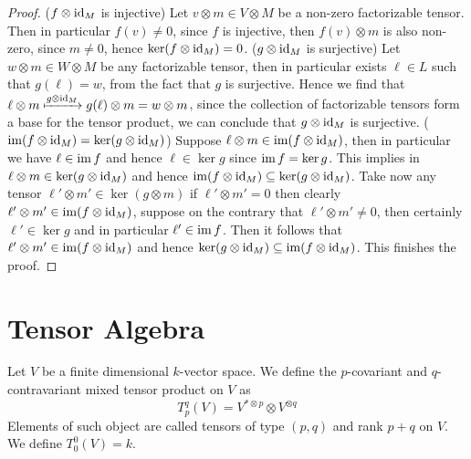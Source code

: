 \begin{proof}
    (\(f \otimes \operatorname{id}_M\) is injective) Let \(v \otimes m \in V \otimes M\) be a
    non-zero factorizable tensor. Then in particular \(f(v) \neq 0\), since \(f\)
    is injective, then \(f(v) \otimes m\) is also non-zero, since \(m \neq 0\),
    hence \(\ker(f \otimes \operatorname{id}_M) = 0\). (\(g \otimes \operatorname{id}_M\) is surjective) Let
    \(w \otimes m \in W \otimes M\) be any factorizable tensor, then in particular
    exists \(\ell \in L\) such that \(g(\ell) = w\), from the fact that \(g\) is
    surjective. Hence we find that \(\ell \otimes m \xmapsto{g \otimes \operatorname{id}_M}
    g(\ell) \otimes m = w \otimes m\), since the collection of factorizable
    tensors form a base for the tensor product, we can conclude that \(g \otimes
    \operatorname{id}_M\) is surjective. (\(\operatorname{im}(f \otimes \operatorname{id}_M) = \ker(g \otimes \operatorname{id}_M)\))
    Suppose \(\ell \otimes m \in \operatorname{im}(f \otimes \operatorname{id}_M)\), then in particular we
    have \(\ell \in \operatorname{im} f\) and hence \(\ell \in \ker g\) since \(\operatorname{im} f = \ker
    g\). This implies in \(\ell \otimes m \in \ker(g \otimes \operatorname{id}_M)\) and hence
    \(\operatorname{im}(f \otimes \operatorname{id}_M) \subseteq \ker(g \otimes \operatorname{id}_M)\). Take now any tensor
    \(\ell' \otimes m' \in \ker(g \otimes m)\) if \(\ell' \otimes m' = 0\) then
    clearly  \(\ell' \otimes m' \in \operatorname{im}(f \otimes \operatorname{id}_M)\), suppose on the
    contrary that \(\ell' \otimes m' \neq 0\), then certainly \(\ell' \in \ker g\)
    and in particular \(\ell' \in \operatorname{im} f\). Then it follows that \(\ell' \otimes m'
    \in \operatorname{im}(f \otimes \operatorname{id}_M)\) and hence \(\ker(g \otimes \operatorname{id}_M) \subseteq \operatorname{im}(f
    \otimes \operatorname{id}_M)\). This finishes the proof.
\end{proof}

\section{Tensor Algebra}

\begin{definition}
    Let \(V\) be a finite dimensional \(k\)-vector space. We define the
    \(p\)-covariant and \(q\)-contravariant mixed tensor product on \(V\) as
    \[
        T_p^q(V) = V^{* \otimes p} \otimes V^{\otimes q}
    \]
    Elements of such object are called tensors of type \((p, q)\) and rank \(p +
    q\) on \(V\). We define \(T_0^0(V) = k\).
\end{definition}

